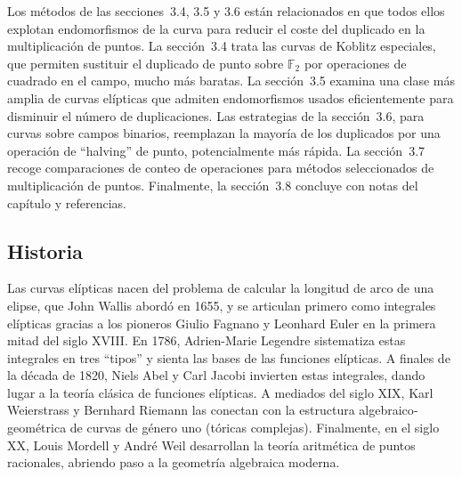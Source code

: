 Los métodos de las secciones~3.4, 3.5 y 3.6 están relacionados en que todos ellos explotan endomorfismos de la curva para reducir el coste del duplicado en la multiplicación de puntos. La sección~3.4 trata las curvas de Koblitz especiales, que permiten sustituir el duplicado de punto sobre \(\mathbb{F}_2\) por operaciones de cuadrado en el campo, mucho más baratas. La sección~3.5 examina una clase más amplia de curvas elípticas que admiten endomorfismos usados eficientemente para disminuir el número de duplicaciones. Las estrategias de la sección~3.6, para curvas sobre campos binarios, reemplazan la mayoría de los duplicados por una operación de “halving” de punto, potencialmente más rápida. La sección~3.7 recoge comparaciones de conteo de operaciones para métodos seleccionados de multiplicación de puntos. Finalmente, la sección~3.8 concluye con notas del capítulo y referencias.


\subsection{Historia}\label{sec:historia_curvas_elipticas}
Las curvas elípticas nacen del problema de calcular la longitud de arco de una elipse, que John Wallis abordó en 1655, y se articulan primero como integrales elípticas gracias a los pioneros Giulio Fagnano y Leonhard Euler en la primera mitad del siglo XVIII. En 1786, Adrien-Marie Legendre sistematiza estas integrales en tres “tipos” y sienta las bases de las funciones elípticas. A finales de la década de 1820, Niels Abel y Carl Jacobi invierten estas integrales, dando lugar a la teoría clásica de funciones elípticas. A mediados del siglo XIX, Karl Weierstrass y Bernhard Riemann las conectan con la estructura algebraico‐geométrica de curvas de género uno (tóricas complejas). Finalmente, en el siglo XX, Louis Mordell y André Weil desarrollan la teoría aritmética de puntos racionales, abriendo paso a la geometría algebraica moderna.

